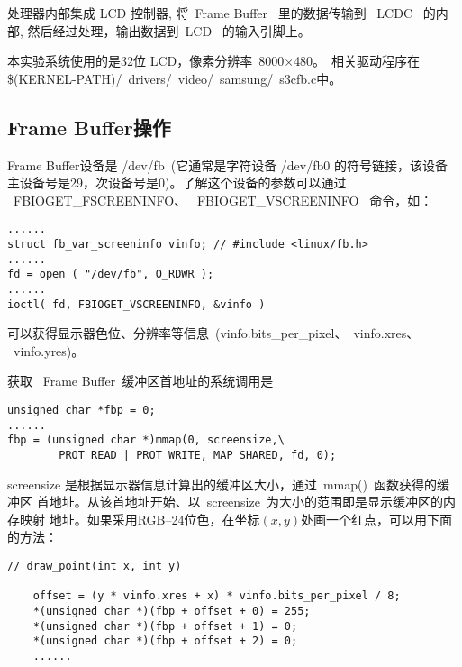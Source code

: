 	处理器内部集成 LCD 控制器, 将~Frame Buffer~ 里的数据传输到 ~LCDC~ 的内部,
然后经过处理，输出数据到~LCD~ 的输入引脚上。

	本实验系统使用的是32位 LCD，像素分辨率~8000$\times$480。~相关驱动程序在
\$(KERNEL-PATH)/~drivers/~video/~samsung/~s3cfb.c中。

\subsection{Frame Buffer操作}
	Frame Buffer设备是 /dev/fb~(它通常是字符设备 /dev/fb0 的符号链接，该设备
主设备号是29，次设备号是0)。了解这个设备的参数可以通过 ~FBIOGET\_FSCREENINFO、
~FBIOGET\_VSCREENINFO~ 命令，如：

\begin{boxedminipage}{.9\textwidth}
\begin{verbatim}
......
struct fb_var_screeninfo vinfo; // #include <linux/fb.h>
......
fd = open ( "/dev/fb", O_RDWR );
......
ioctl( fd, FBIOGET_VSCREENINFO, &vinfo )
\end{verbatim}
\end{boxedminipage}

可以获得显示器色位、分辨率等信息~(vinfo.bits\_per\_pixel、~vinfo.xres、
~vinfo.yres)。

获取 ~Frame Buffer~缓冲区首地址的系统调用是

\begin{boxedminipage}{.9\textwidth}
\begin{verbatim}
unsigned char *fbp = 0;
......
fbp = (unsigned char *)mmap(0, screensize,\
        PROT_READ | PROT_WRITE, MAP_SHARED, fd, 0);
\end{verbatim}
\end{boxedminipage}

screensize 是根据显示器信息计算出的缓冲区大小，通过~mmap()~函数获得的缓冲区
首地址。从该首地址开始、以~screensize~为大小的范围即是显示缓冲区的内存映射
地址。如果采用RGB--24位色，在坐标$(x, y)$处画一个红点，可以用下面的方法：

\begin{boxedminipage}{.9\textwidth}
\begin{verbatim}
// draw_point(int x, int y)

    offset = (y * vinfo.xres + x) * vinfo.bits_per_pixel / 8;
    *(unsigned char *)(fbp + offset + 0) = 255;
    *(unsigned char *)(fbp + offset + 1) = 0;
    *(unsigned char *)(fbp + offset + 2) = 0;
    ......
\end{verbatim}
\end{boxedminipage}

